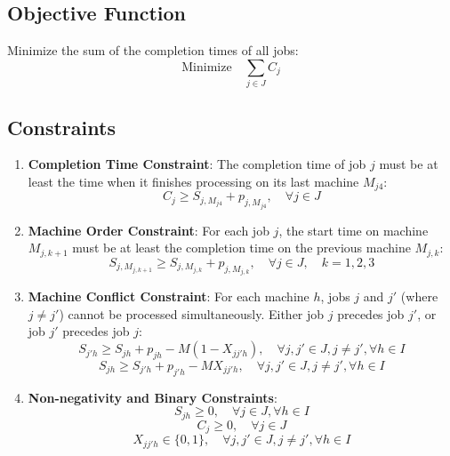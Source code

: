 \documentclass{article}
\begin{document}
\subsection*{Objective Function}
Minimize the sum of the completion times of all jobs:
\begin{equation}
\text{Minimize} \quad \sum_{j \in J} C_j
\end{equation}

\subsection*{Constraints}
\begin{enumerate}
    \item \textbf{Completion Time Constraint}: The completion time of job $j$ must be at least the time when it finishes processing on its last machine $M_{j4}$:
    \begin{equation}
    C_j \geq S_{j, M_{j4}} + p_{j, M_{j4}}, \quad \forall j \in J
    \end{equation}

    \item \textbf{Machine Order Constraint}: For each job $j$, the start time on machine $M_{j,k+1}$ must be at least the completion time on the previous machine $M_{j,k}$:
    \begin{equation}
    S_{j, M_{j,k+1}} \geq S_{j, M_{j,k}} + p_{j, M_{j,k}}, \quad \forall j \in J, \quad k = 1, 2, 3
    \end{equation}

    \item \textbf{Machine Conflict Constraint}: For each machine $h$, jobs $j$ and $j'$ (where $j \neq j'$) cannot be processed simultaneously. Either job $j$ precedes job $j'$, or job $j'$ precedes job $j$:
    \begin{equation}
    S_{j'h} \geq S_{jh} + p_{jh} - M (1 - X_{jj'h}), \quad \forall j, j' \in J, j \neq j', \forall h \in I
    \end{equation}
    \begin{equation}
    S_{jh} \geq S_{j'h} + p_{j'h} - M X_{jj'h}, \quad \forall j, j' \in J, j \neq j', \forall h \in I
    \end{equation}

    \item \textbf{Non-negativity and Binary Constraints}:
    \begin{equation}
    S_{jh} \geq 0, \quad \forall j \in J, \forall h \in I
    \end{equation}
    \begin{equation}
    C_j \geq 0, \quad \forall j \in J
    \end{equation}
    \begin{equation}
    X_{jj'h} \in \{0, 1\}, \quad \forall j, j' \in J, j \neq j', \forall h \in I
    \end{equation}
\end{enumerate}
\end{document}
